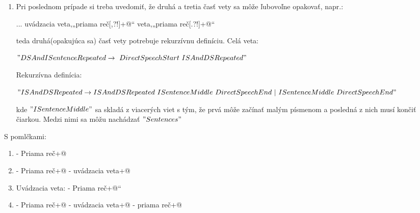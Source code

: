 \documentclass[12pt,a4paper]{report}
\theoremstyle{definition}
\theoremstyle{remark}
\begin{document}
\begin{enumerate}[leftmargin=*]
\item Pri poslednom prípade si treba uvedomiť, že druhá a tretia časť vety sa môže ľubovoľne opakovať, napr.: 

\verb@... uvádzacia veta,„priama reč[,?!]+@“  veta,„priama reč[.?!]+@“


teda druhá(opakujúca sa) časť vety potrebuje rekurzívnu definíciu. Celá veta:


$"DSAndISentenceRepeated \to \ DirectSpeechStart \ ISAndDSRepeated"$

Rekurzívna definícia:


$"ISAndDSRepeated \to \\ ISAndDSRepeated \ ISentenceMiddle \ DirectSpeechEnd \ | \\ \ ISentenceMiddle\ DirectSpeechEnd"$

kde $"ISentenceMiddle"$ sa skladá z viacerých viet s tým, že prvá môže začínať malým písmenom a posledná z nich musí končiť čiarkou. Medzi nimi sa môžu nachádzať $"Sentences"$ 
\end{enumerate}
\newpage
\noindent S pomlčkami:
\begin{enumerate}[leftmargin=*]
\item - Priama reč\verb@[.?!]+@
\item - Priama reč\verb@[,?!]+@ - uvádzacia veta\verb@[.?!]+@
\item Uvádzacia veta: - Priama reč\verb@[.?!]+@“
\item - Priama reč\verb@[,?!]+@ - uvádzacia veta\verb@[,?!]+@ - priama reč\verb@[.?!]+@
\end{enumerate}
\end{document}
